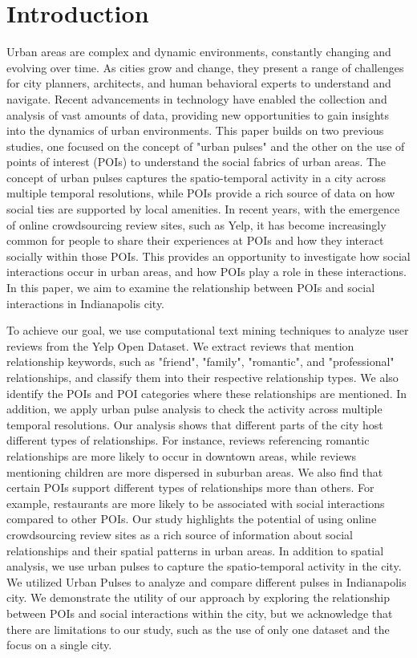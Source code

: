 \section{Introduction}
Urban areas are complex and dynamic environments, constantly changing and evolving over time. As cities grow and change, they present a range of challenges for city planners, architects, and human behavioral experts to understand and navigate. Recent advancements in technology have enabled the collection and analysis of vast amounts of data, providing new opportunities to gain insights into the dynamics of urban environments. 
This paper builds on two previous studies, one focused on the concept of "urban pulses\cite{b1}" and the other on the use of points of interest (POIs) to understand the social fabrics\cite{b2} of urban areas. The concept of urban pulses captures the spatio-temporal activity in a city across multiple temporal resolutions, while POIs provide a rich source of data on how social ties are supported by local amenities. In recent years, with the emergence of online crowdsourcing review sites, such as Yelp, it has become increasingly common for people to share their experiences at POIs and how they interact socially within those POIs. This provides an opportunity to investigate how social interactions occur in urban areas, and how POIs play a role in these interactions. In this paper, we aim to examine the relationship between POIs and social interactions in Indianapolis city.

To achieve our goal, we use computational text mining techniques to analyze user reviews from the Yelp Open Dataset. We extract reviews that mention relationship keywords, such as "friend", "family", "romantic", and "professional" relationships, and classify them into their respective relationship types. We also identify the POIs and POI categories where these relationships are mentioned. In addition, we apply urban pulse analysis to check the activity across multiple temporal resolutions. Our analysis shows that different parts of the city host different types of relationships. For instance, reviews referencing romantic relationships are more likely to occur in downtown areas, while reviews mentioning children are more dispersed in suburban areas. We also find that certain POIs support different types of relationships more than others. For example, restaurants are more likely to be associated with social interactions compared to other POIs. Our study highlights the potential of using online crowdsourcing review sites as a rich source of information about social relationships and their spatial patterns in urban areas. In addition to spatial analysis, we use urban pulses to capture the spatio-temporal activity in the city. We utilized Urban Pulses to analyze and compare different pulses in Indianapolis city. We demonstrate the utility of our approach by exploring the relationship between POIs and social interactions within the city, but we acknowledge that there are limitations to our study, such as the use of only one dataset and the focus on a single city.

